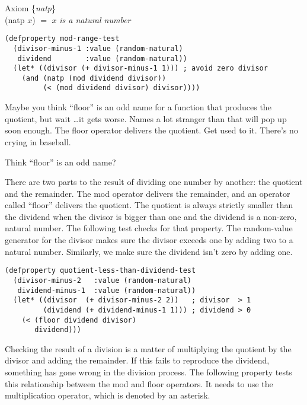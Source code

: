 \label{natp-axiom-formal}
\begin{center}
Axiom \{\emph{natp}\} \\
(natp $x$) $=$ $x$ \emph{is a natural number}
\end{center}

\begin{Verbatim}
(defproperty mod-range-test
  (divisor-minus-1 :value (random-natural)
   dividend        :value (random-natural))
  (let* ((divisor (+ divisor-minus-1 1))) ; avoid zero divisor
    (and (natp (mod dividend divisor))
         (< (mod dividend divisor) divisor))))
\end{Verbatim}

\begin{aside}
Maybe you think ``floor'' is an odd name
for a function that produces the quotient, but wait \dots it gets worse.
Names a lot stranger than that will pop up soon enough.
The floor operator delivers the quotient. Get used to it.
There's no crying in baseball.
\caption{Think ``floor'' is an odd name?}
\label{floor-is-odd}
\end{aside}

There are two parts to the result
of dividing one number by another: the quotient and the remainder.
The mod operator delivers the remainder,
\label{floor-def}
and an operator called ``floor'' delivers the quotient.
The quotient is always strictly smaller
than the dividend when the divisor is bigger than one
and the dividend is a non-zero, natural number.
The following test checks for that property.
The random-value generator for the divisor
makes sure the divisor exceeds one by adding two
to a natural number.
Similarly, we make sure the dividend isn't zero by adding one.

\label{quotient-less-than-dividend-test}
\begin{Verbatim}
(defproperty quotient-less-than-dividend-test
  (divisor-minus-2   :value (random-natural)
   dividend-minus-1  :value (random-natural))
  (let* ((divisor  (+ divisor-minus-2 2))   ; divisor  > 1
         (dividend (+ dividend-minus-1 1))) ; dividend > 0
    (< (floor dividend divisor)
       dividend)))
\end{Verbatim}

Checking the result of a division is a matter
of multiplying the quotient by the divisor and adding the remainder.
If this fails to reproduce the dividend,
something has gone wrong in the division process.
The following property tests this relationship
between the mod and floor operators.
It needs to use the multiplication operator, which is denoted by an asterisk.

